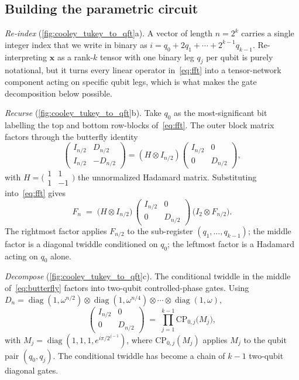 \documentclass[a4paper, twocolumn]{quantumarticle}
\newcommand{\diag}{\operatorname{diag}}
\begin{document}
\subsection{Building the parametric circuit}
\label{sec:gate_decomposition}

\emph{Re-index} (\cref{fig:cooley_tukey_to_qft}a). A vector of length $n = 2^k$ carries a single integer index that we write in binary as $i = q_0 + 2 q_1 + \cdots + 2^{k-1} q_{k-1}$.
Re-interpreting $\mathbf{x}$ as a rank-$k$ tensor with one binary leg $q_j$ per qubit is purely notational, but it turns every linear operator in~\cref{eq:fft} into a tensor-network component acting on specific qubit legs, which is what makes the gate decomposition below possible.

\emph{Recurse} (\cref{fig:cooley_tukey_to_qft}b). Take $q_0$ as the most-significant bit labelling the top and bottom row-blocks of~\cref{eq:fft}. The outer block matrix factors through the butterfly identity
\begin{equation}
  \begin{pmatrix} I_{n/2} & D_{n/2} \\ I_{n/2} & -D_{n/2} \end{pmatrix}
  = (H \otimes I_{n/2})
    \begin{pmatrix} I_{n/2} & 0 \\ 0 & D_{n/2} \end{pmatrix},
  \label{eq:butterfly-id}
\end{equation}
with $H = \bigl(\begin{smallmatrix} 1 & 1 \\ 1 & -1 \end{smallmatrix}\bigr)$ the unnormalized Hadamard matrix. Substituting into~\cref{eq:fft} gives
\begin{equation}
  F_n \;=\; \bigl( H \otimes I_{n/2} \bigr) \,
            \begin{pmatrix} I_{n/2} & 0 \\ 0 & D_{n/2} \end{pmatrix} \,
            \bigl( I_2 \otimes F_{n/2} \bigr).
  \label{eq:butterfly}
\end{equation}
The rightmost factor applies $F_{n/2}$ to the sub-register $(q_1, \ldots, q_{k-1})$; the middle factor is a diagonal twiddle conditioned on $q_0$; the leftmost factor is a Hadamard acting on $q_0$ alone.

\emph{Decompose} (\cref{fig:cooley_tukey_to_qft}c). The conditional twiddle in the middle of~\cref{eq:butterfly} factors into two-qubit controlled-phase gates.
Using $D_n = \diag(1, \omega^{n/2}) \otimes \diag(1, \omega^{n/4}) \otimes \cdots \otimes \diag(1, \omega)$,
\begin{equation}
  \begin{pmatrix} I_{n/2} & 0 \\ 0 & D_{n/2} \end{pmatrix}
  \;=\; \prod_{j=1}^{k-1} \mathrm{CP}_{0,j}\bigl(M_j\bigr),
  \label{eq:cphase}
\end{equation}
with $M_j = \diag(1, 1, 1, e^{i\pi/2^{j-1}})$, where $\mathrm{CP}_{0,j}(M_j)$ applies $M_j$ to the qubit pair $(q_0, q_j)$.
The conditional twiddle has become a chain of $k - 1$ two-qubit diagonal gates.
\end{document}
